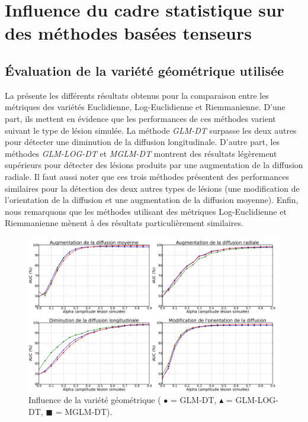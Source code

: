 
\chapter{Influence du cadre statistique sur des méthodes basées tenseurs}
\label{Chapter9}





\section{Évaluation de la variété géométrique utilisée}
La  présente les différents résultats obtenus pour la comparaison entre les métriques des variétés Euclidienne, Log-Euclidienne et Riemmanienne.
D'une part, ils mettent en évidence que les performances de ces méthodes varient suivant le type de lésion simulée.
La méthode \textit{GLM-DT} surpasse les deux autres pour détecter une diminution de la diffusion longitudinale.
D'autre part, les méthodes \textit{GLM-LOG-DT} et \textit{MGLM-DT} montrent des résultats légèrement supérieurs 
pour détecter des lésions produits par une augmentation de la diffusion radiale.
Il faut aussi noter que ces trois méthodes présentent des performances similaires pour la détection des deux autres types de lésions 
(une modification de l'orientation de la diffusion et une augmentation de la diffusion moyenne).
Enfin, nous remarquons que les méthodes utilisant des métriques Log-Euclidienne et Riemmanienne mènent à des résultats particulièrement similaires.

\begin{figure}[t]
    \centering
    \includegraphics[width=1\textwidth]{Images/AUC_frameworks_gaussian8_fr.pdf}
    \caption{\label{fig:res_manifold} Influence de la variété géométrique ({\color{green} $\bullet$ = GLM-DT},  {\color{blue} $\blacktriangle$ = GLM-LOG-DT}, {\color{red} $\blacksquare$ = MGLM-DT}).}
\end{figure}


